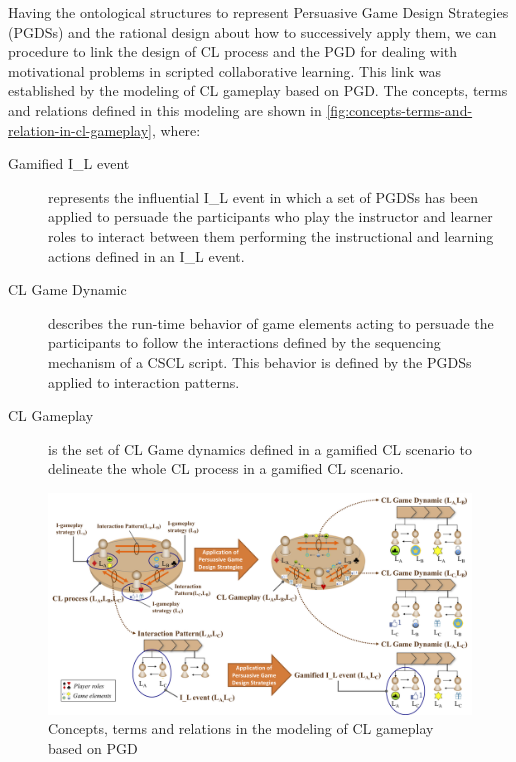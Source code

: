 Having the ontological structures to represent Persuasive Game Design Strategies (PGDSs) and the rational design about how to successively apply them, we can procedure to link the design of CL process and the PGD for dealing with motivational problems in scripted collaborative learning. 
This link was established by the modeling of CL gameplay based on PGD.
The concepts, terms and relations defined in this modeling are shown in \autoref{fig:concepts-terms-and-relation-in-cl-gameplay}, where:

\begin{description}
\item[Gamified I\_L event]
represents the influential I\_L event in which a set of PGDSs has been applied to persuade the participants who play the instructor and learner roles to interact between them performing the instructional and learning actions defined in an I\_L event.

\item[CL Game Dynamic]
describes the run-time behavior of game elements acting to persuade the participants to follow the interactions defined by the sequencing mechanism of a CSCL script. This behavior is defined by the PGDSs applied to interaction patterns.
 
\item[CL Gameplay]
is the set of CL Game dynamics defined in a gamified CL scenario to delineate the whole CL process in a gamified CL scenario.
\end{description}


\begin{figure}[!htbp]
 \caption{Concepts, terms and relations in the modeling of CL gameplay based on PGD}
 \label{fig:concepts-terms-and-relation-in-cl-gameplay}
 \centering
 \includegraphics[width=1\textwidth]{images/chap-ontogacles2/concepts-terms-and-relation-in-cl-gameplay.png}
 \fautor
\end{figure}

